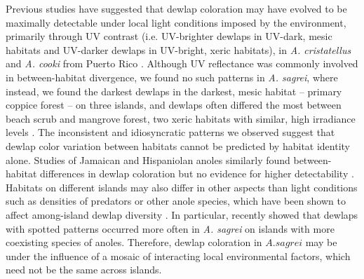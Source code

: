 Previous studies have suggested that dewlap coloration may have evolved to be maximally detectable under local light conditions imposed by the environment, primarily through UV contrast (i.e. UV-brighter dewlaps in UV-dark, mesic habitats and UV-darker dewlaps in UV-bright, xeric habitats), in \textit{A. cristatellus} and \textit{A. cooki} from Puerto Rico \citep{Leal2002, Leal2004}. Although UV reflectance was commonly involved in between-habitat divergence, we found no such patterns in \textit{A. sagrei}, where instead, we found the darkest dewlaps in the darkest, mesic habitat -- primary coppice forest -- on three islands, and dewlaps often differed the most between beach scrub and mangrove forest, two xeric habitats with similar, high irradiance levels \citep{Howard1950, Schoener1968}. The inconsistent and idiosyncratic patterns we observed suggest that dewlap color variation between habitats cannot be predicted by habitat identity alone. Studies of Jamaican and Hispaniolan anoles similarly found between-habitat differences in dewlap coloration but no evidence for higher detectability \citep{Fleishman2009, Ng2012}. Habitats on different islands may also differ in other aspects than light conditions such as densities of predators or other anole species, which have been shown to affect among-island dewlap diversity \citep{Vanhooydonck2009, Baeckens2018}. In particular, \citet{Baeckens2018} recently showed that dewlaps with spotted patterns occurred more often in \textit{A. sagrei} on islands with more coexisting species of anoles. Therefore, dewlap coloration in $A. sagrei$ may be under the influence of a mosaic of interacting local environmental factors, which need not be the same across islands.


